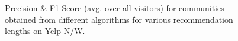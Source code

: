 \begin{figure}
\begin{center}
\end{center}
\vspace{-0.25in}
\caption{Precision \& F1 Score (avg. over all visitors) for communities obtained from different algorithms 
for various recommendation lengths on Yelp N/W.}
\vspace{-0.25in}
\label{reco}
\end{figure}





